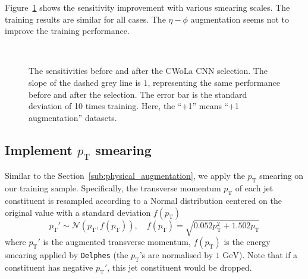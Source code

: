 \documentclass[12pt]{article}
\begin{document}
        Figure~\ref{fig:sensitivity_improvement_aug_1_smearing_scale} shows the sensitivity improvement with various smearing scales. The training results are similar for all cases. The $\eta-\phi$ augmentation seems not to improve the training performance.
        \begin{figure}[htpb]
            \centering
             \\
            \caption{The sensitivities before and after the CWoLa CNN selection. The slope of the dashed grey line is $1$, representing the same performance before and after the selection. The error bar is the standard deviation of 10 times training. Here, the ``+1'' means ``+1 augmentation'' datasets.}
            \label{fig:sensitivity_improvement_aug_1_smearing_scale}
        \end{figure}
    \subsection{Implement \texorpdfstring{$p_{\mathrm{T}}$}{pT} smearing}%
    \label{sub:implement_pt_smearing}
        Similar to the Section~\ref{sub:physical_augmentation}, we apply the $p_{\text{T}}$ smearing on our training sample. Specifically, the transverse momentum $p_{\text{T}}$ of each jet constituent is resampled according to a Normal distribution centered on the original value with a standard deviation $f(p_{\text{T}})$
        \begin{equation}
            p_{\text{T}}' \sim \mathcal{N}\left( p_{\text{T}}, f(p_{\text{T}}) \right), \quad f(p_{\text{T}}) = \sqrt{0.052 p_{\text{T}}^2 + 1.502p_{\text{T}}}
        \end{equation}
        where $p_{\text{T}}'$ is the augmented transverse momentum, $f\left( p_\text{T} \right) $ is the energy smearing applied by \verb|Delphes| (the $p_{\text{T}}$'s are normalised by $\text{1 GeV}$). Note that if a constituent has negative $p_{\text{T}}'$, this jet constituent would be dropped.
\end{document}
